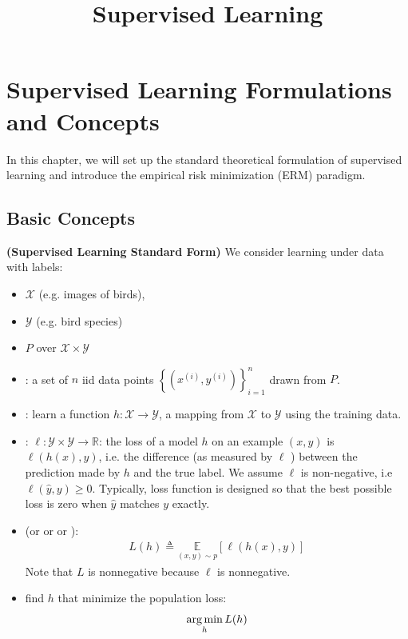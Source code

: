 \documentclass{article}
\title{Supervised Learning}
\newcommand{\bfs}[1]{\textbf{({#1}) }}
\begin{document}
\maketitle

\section{Supervised Learning Formulations and Concepts}

In this chapter, we will set up the standard theoretical formulation of supervised learning and introduce the empirical risk minimization (ERM) paradigm. 
\subsection{Basic Concepts}
\begin{defa}\bfs{Supervised Learning Standard Form} We consider learning under data with labels:
\begin{itemize}
    \item {} $\mathcal{X}$ (e.g. images of birds),
    \item {} $\mathcal{Y}$ (e.g. bird species)
    \item {} $P$ over $\mathcal{X} \times \mathcal{Y}$
    \item {}: a set of $n$ \gls{iid} data points $\left\{\left(x^{(i)}, y^{(i)}\right)\right\}_{i=1}^{n}$ drawn from $P$.
    \item {}: learn a  function $h: \mathcal{X} \rightarrow \mathcal{Y}$, a mapping from $\mathcal{X}$ to $\mathcal{Y}$ using the training data.
    \item {}: $\ell: \mathcal{Y} \times \mathcal{Y} \rightarrow \mathbb{R}$: the loss of a model $h$ on an example $(x, y)$ is $\ell(h(x), y)$, i.e. the difference (as measured by $\ell$ ) between the prediction made by $h$ and the true label. We assume $\ell$ is non-negative, i.e $\ell(\hat{y}, y) \geq 0 .$ Typically, loss function is designed so that the best possible loss is zero when $\hat{y}$ matches $y$ exactly. 
    \item   {} (or  or  or ):
\begin{align*}
L(h) \triangleq \underset{(x, y) \sim p}{\mathbb{E}}[\ell(h(x), y)]
\end{align*}
Note that $L$ is nonnegative because $\ell$ is nonnegative. 
\item {} find $h$ that minimize the population loss: $$\operatorname*{arg\,min}_{h} L(h)$$
\end{itemize}
\end{defa}
\end{document}
